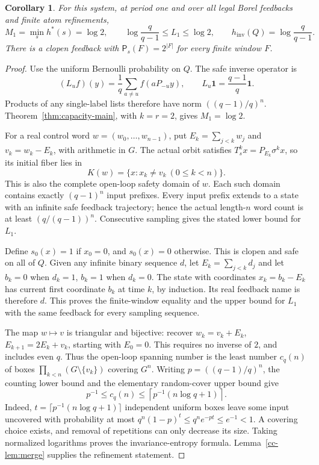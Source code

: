 \documentclass[11pt,reqno]{amsart}
\numberwithin{equation}{section}
\newtheorem{corollary}[theorem]{Corollary}
\theoremstyle{definition}
\newcommand{\Patt}{\mathsf P}
\newcommand{\hinv}{h_{\mathrm{inv}}}
\newcommand{\one}{\mathbf 1}
\begin{document}
\begin{corollary}\label{cor:cyclic}
For this system, at period one and over all legal Borel feedbacks
and finite atom refinements,
\[
 M_1=\min_s h^*(s)=\log2,\qquad
 \log\frac q{q-1}\le L_1\le\log2,\qquad
 \hinv(Q)=\log\frac q{q-1}.
\]
There is a clopen feedback with $\Patt_s(F)=2^{|F|}$ for every
finite window $F$.
\end{corollary}
\begin{proof}
Use the uniform Bernoulli probability on $Q$. The safe inverse
operator is
\[
 (L_uf)(y)=\frac1q\sum_{a\ne u}f(aP_{-u}y),
 \qquad L_u\one=\frac{q-1}{q}\one.
\]
Products of any single-label lists therefore have norm
$((q-1)/q)^n$. Theorem~\ref{thm:capacity-main}, with $k=r=2$,
gives $M_1=\log2$.

For a real control word $w=(w_0,\ldots,w_{n-1})$, put
$E_k=\sum_{j<k}w_j$ and $v_k=w_k-E_k$, with arithmetic in $G$.
The actual orbit satisfies $T_s^kx=P_{E_k}\sigma^kx$, so its
initial fiber lies in
\[
 K(w)=\{x:x_k\ne v_k\ (0\le k<n)\}.
\]
This is also the complete open-loop safety domain of $w$.
Each such domain contains exactly $(q-1)^n$ input prefixes.
Every input prefix extends to a state with an infinite safe
feedback trajectory; hence the actual length-$n$ word count is
at least $(q/(q-1))^n$. Consecutive sampling gives the stated
lower bound for $L_1$.

Define $s_0(x)=1$ if $x_0=0$, and $s_0(x)=0$ otherwise.
This is clopen and safe on all of $Q$. Given any infinite binary
sequence $d$, let $E_k=\sum_{j<k}d_j$ and let $b_k=0$ when
$d_k=1$, $b_k=1$ when $d_k=0$. The state with coordinates
$x_k=b_k-E_k$ has current first coordinate $b_k$ at time $k$,
by induction. Its real feedback name is therefore $d$.
This proves the finite-window equality and the upper bound for
$L_1$ with the same feedback for every sampling sequence.

The map $w\mapsto v$ is triangular and bijective: recover
$w_k=v_k+E_k$, $E_{k+1}=2E_k+v_k$, starting with $E_0=0$.
This requires no inverse of $2$, and includes even $q$.
Thus the open-loop spanning number is the least number $c_q(n)$
of boxes $\prod_{k<n}(G\setminus\{v_k\})$ covering $G^n$.
Writing $p=((q-1)/q)^n$, the counting lower bound and the
elementary random-cover upper bound give
\[
 p^{-1}\le c_q(n)\le
 \left\lceil p^{-1}(n\log q+1)\right\rceil.
\]
Indeed, $t=\lceil p^{-1}(n\log q+1)\rceil$ independent uniform
boxes leave some input uncovered with probability at most
$q^n(1-p)^t\le q^ne^{-pt}\le e^{-1}<1$.
A covering choice exists, and removal of repetitions can only
decrease its size. Taking normalized logarithms proves the
invariance-entropy formula. Lemma~\ref{cc-lem:merge} supplies
the refinement statement.
\end{proof}
\end{document}

